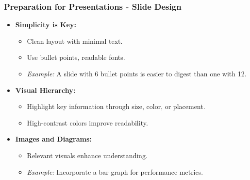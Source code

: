 \documentclass[aspectratio=169]{beamer}
\begin{document}
\begin{frame}[fragile]
    \frametitle{Preparation for Presentations - Slide Design}
    \begin{itemize}
        \item \textbf{Simplicity is Key:} 
            \begin{itemize}
                \item Clean layout with minimal text.
                \item Use bullet points, readable fonts.
                \item \textit{Example:} A slide with 6 bullet points is easier to digest than one with 12.
            \end{itemize}
        \item \textbf{Visual Hierarchy:}
            \begin{itemize}
                \item Highlight key information through size, color, or placement.
                \item High-contrast colors improve readability.
            \end{itemize}
        \item \textbf{Images and Diagrams:}
            \begin{itemize}
                \item Relevant visuals enhance understanding.
                \item \textit{Example:} Incorporate a bar graph for performance metrics.
            \end{itemize}
    \end{itemize}
\end{frame}
\end{document}
